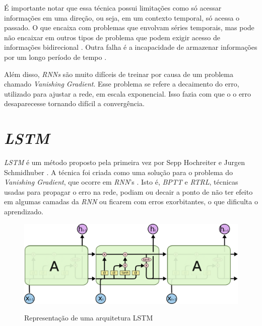 É importante notar que essa técnica possui limitações como só acessar informações em uma direção, ou seja, em um contexto temporal, só acessa o passado. O que encaixa com problemas que envolvam séries temporais, mas pode não encaixar em outros tipos de problema que podem exigir acesso de informações bidirecional \cite{alex2012}. Outra falha é a incapacidade de armazenar informações por um longo período de tempo \cite{hochreiter2001gradient}. 

Além disso, \textit{\acrshort{RNN}s} são muito difíceis de treinar por causa de um problema chamado \textit{Vanishing Gradient}. Esse problema se refere a decaimento do erro, utilizado para ajustar a rede, em escala exponencial. Isso fazia com que o o erro desaparecesse tornando difícil a convergência. \cite{doi:10.1162/neco.1997.9.8.1735}

\section{\textit{\acrfull{LSTM}}}

\textit{\acrshort{LSTM}} é um método proposto pela primeira vez por Sepp Hochreiter e Jurgen Schmidhuber \cite{doi:10.1162/neco.1997.9.8.1735}. A técnica foi criada como uma solução para o problema do \textit{Vanishing Gradient}, que ocorre em \textit{\acrshort{RNN}}'s \cite{doi:10.1162/neco.1997.9.8.1735}. Isto é, \textit{\acrfull{BPTT}} e \textit{\acrfull{RTRL}}, técnicas usadas para propagar o erro na rede, podiam ou decair a ponto de não ter efeito em algumas camadas da \textit{\acrshort{RNN}} ou ficarem com erros exorbitantes, o que dificulta o aprendizado. 

\begin{figure}[htbp]
    \centering
    \includegraphics[scale=0.4]{monography/img/models/lstm3.png}
    \label{figure:lstm}
    \caption[Representação de uma arquitetura LSTM]{Representação de uma arquitetura LSTM\footnotemark}
\end{figure}

